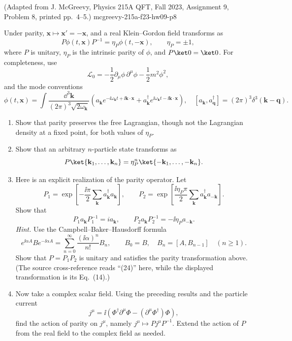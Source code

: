 \begin{enumerate}
  {(Adapted from J. McGreevy, Physics 215A QFT, Fall 2023, Assignment 9, Problem 8, printed pp.~4--5.)}
  {mcgreevy-215a-f23-hw09-p8}

Under parity, \(\mathbf x\mapsto\mathbf x'=-\mathbf x\), and a real
Klein--Gordon field transforms as
\[
 P\phi(t,\mathbf x)P^{-1}=\eta_P\phi(t,-\mathbf x),
 \qquad \eta_P=\pm1,
\]
where \(P\) is unitary, \(\eta_P\) is the intrinsic parity of \(\phi\),
and \(P\ket0=\ket0\).  For completeness, use
\[
 \mathcal L_0=-\frac12\partial_\mu\phi\,\partial^\mu\phi
              -\frac12m^2\phi^2,
\]
and the mode conventions
\[
 \phi(t,\mathbf x)=\int\!\frac{\dd^3\mathbf k}{(2\pi)^3\sqrt{2\omega_{\mathbf k}}}
 \left(a_{\mathbf k}e^{-\ii\omega_{\mathbf k}t+\ii\mathbf k\cdot\mathbf x}
 +a_{\mathbf k}^\dagger e^{\ii\omega_{\mathbf k}t-\ii\mathbf k\cdot\mathbf x}\right),
 \quad
 [a_{\mathbf k},a_{\mathbf q}^\dagger]=(2\pi)^3\delta^3(\mathbf k-\mathbf q).
\]
\begin{enumerate}
\item[(a)] Show that parity preserves the free Lagrangian, though not the
Lagrangian density at a fixed point, for both values of \(\eta_P\).
\item[(b)] Show that an arbitrary \(n\)-particle state transforms as
\[
 P\ket{\mathbf k_1,\ldots,\mathbf k_n}
 =\eta_P^n\ket{-\mathbf k_1,\ldots,-\mathbf k_n}.
\]
\item[(c)] Here is an explicit realization of the parity operator.  Let
\[
 P_1=\exp\!\left[-\frac{\ii\pi}{2}\sum_{\mathbf k}
 a_{\mathbf k}^\dagger a_{\mathbf k}\right],\qquad
 P_2=\exp\!\left[\frac{\ii\eta_P\pi}{2}\sum_{\mathbf k}
 a_{\mathbf k}^\dagger a_{-\mathbf k}\right].
\]
Show that
\[
 P_1a_{\mathbf k}P_1^{-1}=ia_{\mathbf k},\qquad
 P_2a_{\mathbf k}P_2^{-1}=-\ii\eta_Pa_{-\mathbf k}.
\]
\emph{Hint.} Use the Campbell--Baker--Hausdorff formula
\[
 e^{\ii\alpha A}Be^{-\ii\alpha A}
 =\sum_{n=0}^{\infty}\frac{(\ii\alpha)^n}{n!}B_n,
 \qquad B_0=B,\quad B_n=[A,B_{n-1}]\quad(n\ge1).
\]
Show that \(P=P_1P_2\) is unitary and satisfies the parity transformation
above.  (The source cross-reference reads ``(24)'' here, while the
displayed transformation is its Eq.~(14).)
\item[(d)] Now take a complex scalar field.  Using the preceding results
and the particle current
\[
 j^\mu=\ii\left(\Phi^\dagger\partial^\mu\Phi
 -(\partial^\mu\Phi^\dagger)\Phi\right),
\]
find the action of parity on \(j^\mu\), namely
\(j^\mu\mapsto Pj^\mu P^{-1}\).  Extend the action of \(P\) from the real
field to the complex field as needed.
\end{enumerate}
\end{enumerate}

